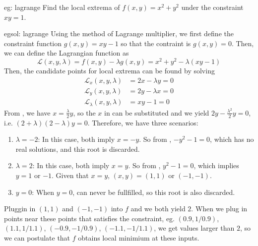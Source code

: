 \begin{eg}[]{eg: lagrange}
   Find the local extrema of $f(x,y) = x^2 + y^2$ under the constraint $xy = 1$.
\end{eg}

\begin{egsol}[]{egsol: lagrange}
    Using the method of Lagrange multiplier, we first define the constraint function $g(x,y) = xy - 1$ so that the contraint is $g(x,y) = 0$.  Then, we can define the Lagrangian function as 
    \[\mathcal{L}(x,y,\lambda) = f(x,y) - \lambda g(x,y) = x^2 + y^2 - \lambda(xy-1)\]
    Then, the candidate points for local extrema can be found by solving
    \begin{align}
        \mathcal{L}_x(x,y,\lambda) &= 2x - \lambda y = 0 \label{eq: lagrange_x}\\
        \mathcal{L}_y(x,y,\lambda) &= 2y - \lambda x = 0 \label{eq: lagrange_y}\\
        \mathcal{L}_\lambda(x,y,\lambda) &= xy-1 = 0 \label{eq: lagrange_l}
    \end{align}
    From , we have $x = \frac{\lambda}{2}y$, so the $x$ in  can be substituted and we yield $2y - \frac{\lambda^2}{2}y = 0$, i.e. $(2+\lambda)(2-\lambda)y = 0$.  Therefore, we have three scenarios:
    \begin{enumerate}
        \item $\lambda = -2$: In this case, both  imply $x = -y$.  So from , $-y^2-1=0$, which has no real solutions, and this root is discarded.
        \item $\lambda = 2$: In this case, both  imply $x = y$.  So from , $y^2-1=0$, which implies $y = 1$ or $-1$.  Given that $x = y$,  $(x,y) = (1,1)$ or $(-1,-1)$.
        \item $y=0$: When $y=0$,  can never be fullfilled, so this root is also discarded.
    \end{enumerate}
    Pluggin in $(1,1)$ and $(-1,-1)$ into $f$ and we both yield $2$.  When we plug in points near these points that satisfies the constraint, eg. $(0.9, 1/0.9)$, $(1.1, 1/1.1)$, $(-0.9, -1/0.9)$, $(-1.1, -1/1.1)$, we get values larger than $2$, so we can postulate that $f$ obtains local minimium at these inputs.
 \end{egsol}